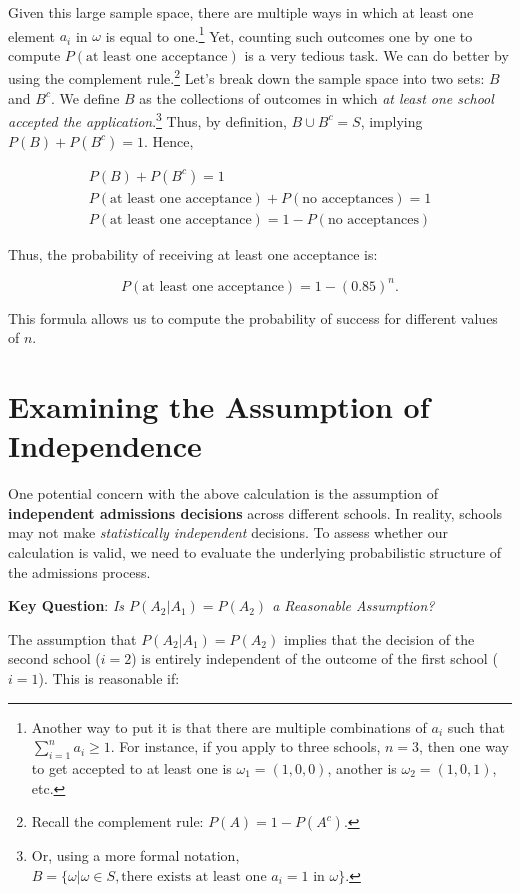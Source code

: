 \documentclass{article}
\begin{document}
Given this large sample space, there are multiple ways in which at least one element $a_i$ in $\omega$ is equal to one.\footnote{Another way to put it is that there are multiple combinations of $a_i$ such that $\sum_{i=1}^{n}a_i \geq 1$. For instance, if you apply to three schools, $n=3$, then one way to get accepted to at least one is $\omega_1=(1,0,0)$, another is $\omega_2=(1,0,1)$, etc.} Yet, counting such outcomes one by one to compute $P(\text{at least one acceptance})$ is a very tedious task. We can do better by using the complement rule.\footnote{Recall the complement rule: $P(A) = 1 - P(A^c)$.} Let's break down the sample space into two sets: $B$ and $B^c$. We define $B$ as the collections of outcomes in which \emph{at least one school accepted the application}.\footnote{Or, using a more formal notation, $B = \{\omega |\omega \in S, \text{there exists at least one $a_i=1$ in $\omega$} \} $.} Thus, by definition, $B \cup B^c = S$, implying $P(B) + P(B^c) = 1$. Hence,

\begin{align*}
P(B) + P(B^c) = 1 \\
P(\text{at least one acceptance}) + P(\text{no acceptances}) = 1 \\
\boxed{
    P(\text{at least one acceptance}) = 1 - P(\text{no acceptances})
}
\end{align*}


Thus, the probability of receiving at least one acceptance is:

\[
P(\text{at least one acceptance}) = 1 - (0.85)^n.
\]

This formula allows us to compute the probability of success for different values of \( n \).

\section{Examining the Assumption of Independence}

One potential concern with the above calculation is the assumption of \textbf{independent admissions decisions} across different schools. In reality, schools may not make \emph{statistically independent} decisions. To assess whether our calculation is valid, we need to evaluate the underlying probabilistic structure of the admissions process.

 \textbf{Key Question}: \emph{Is \( P(A_2 | A_1) = P(A_2)  \) a Reasonable Assumption?}

The assumption that \( P(A_2 | A_1) = P(A_2) \) implies that the decision of the second school ($i=2$) is entirely independent of the outcome of the first school ($i=1$). This is reasonable if:
\end{document}
